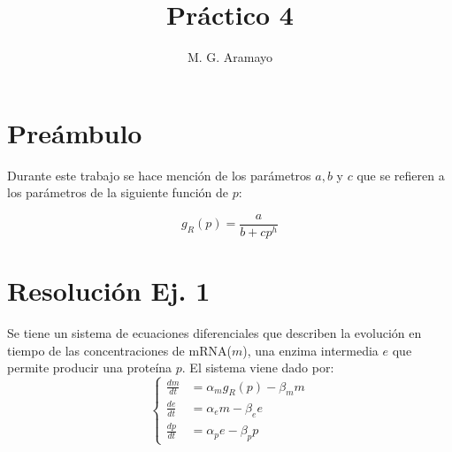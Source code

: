 \documentclass[twocolumn,aps,prl]{revtex4-1}
\begin{document}

\title{Práctico 4}
\author{M. G. Aramayo}


\maketitle



\section{Preámbulo}

Durante este trabajo se hace mención de los parámetros $a, b$ y $c$ que se refieren a los parámetros de la siguiente función de $p$:

\begin{equation}\label{eq:gr}
    g_{R}(p) = \frac{a}{b + c p^{h}}
\end{equation}

\section{Resolución Ej. 1}

Se tiene un sistema de ecuaciones diferenciales que describen la evolución en tiempo de las concentraciones de mRNA($m$), una enzima intermedia $e$ que permite producir una proteína $p$. El sistema viene dado por:
\begin{equation}\label{eq:ecuaciones}
  \left\lbrace 
  \begin{aligned}
    \frac{d m}{d t} &= \alpha_{m} g_{R}(p)-\beta_{m} m \\
    \frac{d e}{d t} &= \alpha_{e} m-\beta_{e} e \\
    \frac{d p}{d t} &= \alpha_{p} e-\beta_{p} p
  \end{aligned}\right.
\end{equation}
\end{document}
